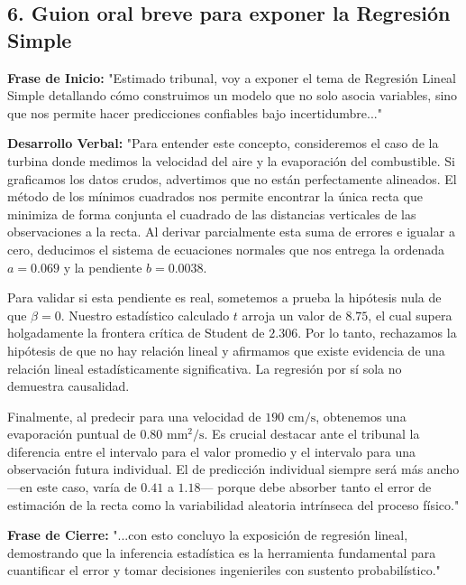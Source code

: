 \documentclass[11pt,a4paper]{article}
\begin{document}
\subsection{6. Guion oral breve para exponer la Regresión Simple}
    \begin{guion}
        \textbf{Frase de Inicio:} "Estimado tribunal, voy a exponer el tema de Regresión Lineal Simple detallando cómo construimos un modelo que no solo asocia variables, sino que nos permite hacer predicciones confiables bajo incertidumbre..."
        
        \textbf{Desarrollo Verbal:} "Para entender este concepto, consideremos el caso de la turbina donde medimos la velocidad del aire y la evaporación del combustible. Si graficamos los datos crudos, advertimos que no están perfectamente alineados. El método de los mínimos cuadrados nos permite encontrar la única recta que minimiza de forma conjunta el cuadrado de las distancias verticales de las observaciones a la recta. Al derivar parcialmente esta suma de errores e igualar a cero, deducimos el sistema de ecuaciones normales que nos entrega la ordenada $a=0.069$ y la pendiente $b=0.0038$. 
        
        Para validar si esta pendiente es real, sometemos a prueba la hipótesis nula de que $\beta=0$. Nuestro estadístico calculado $t$ arroja un valor de $8.75$, el cual supera holgadamente la frontera crítica de Student de $2.306$. Por lo tanto, rechazamos la hipótesis de que no hay relación lineal y afirmamos que existe evidencia de una relación lineal estadísticamente significativa. La regresión por sí sola no demuestra causalidad.
        
        Finalmente, al predecir para una velocidad de $190 \text{ cm/s}$, obtenemos una evaporación puntual de $0.80 \text{ mm}^2\text{/s}$. Es crucial destacar ante el tribunal la diferencia entre el intervalo para el valor promedio y el intervalo para una observación futura individual. El de predicción individual siempre será más ancho —en este caso, varía de $0.41$ a $1.18$— porque debe absorber tanto el error de estimación de la recta como la variabilidad aleatoria intrínseca del proceso físico."
        
        \textbf{Frase de Cierre:} "...con esto concluyo la exposición de regresión lineal, demostrando que la inferencia estadística es la herramienta fundamental para cuantificar el error y tomar decisiones ingenieriles con sustento probabilístico."
    \end{guion}
 
\end{document}
